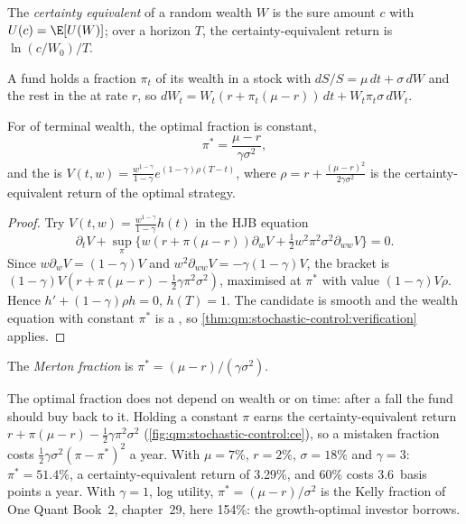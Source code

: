 \begin{definition}\label{def:qm:stochastic-control:ce}
The \emph{certainty equivalent} of a random wealth $W$ is the sure amount $c$
with $U(c) = \E[U(W)]$; over a horizon $T$, the certainty-equivalent return is $\ln(c/W_0)/T$.
\end{definition}

A fund holds a fraction $\pi_t$ of its wealth in a stock with $dS/S = \mu\,dt + \sigma\,dW$ and the rest in the
 at rate $r$, so $dW_t = W_t(r + \pi_t(\mu - r))\,dt + W_t\pi_t\sigma\,dW_t$.

\begin{theorem}[Merton]\label{thm:qm:stochastic-control:merton}
For  of terminal wealth, the optimal fraction is constant,
\[
\pi^* = \frac{\mu - r}{\gamma\sigma^2},
\]
and the  is $V(t, w) = \frac{w^{1-\gamma}}{1-\gamma}e^{(1-\gamma)\rho(T-t)}$, where $\rho = r + \frac{(\mu -
r)^2}{2\gamma\sigma^2}$ is the certainty-equivalent return of the optimal strategy.
\end{theorem}

\begin{proof}
Try $V(t, w) = \frac{w^{1-\gamma}}{1-\gamma}h(t)$ in the HJB equation
\[
\partial_tV + \sup_\pi\bigl\{w(r + \pi(\mu - r))\partial_wV + \tfrac12w^2\pi^2\sigma^2\partial_{ww}V\bigr\} = 0.
\] Since $w\partial_wV = (1 - \gamma)V$ and $w^2\partial_{ww}V = -\gamma(1 - \gamma)V$, the bracket is
$(1 - \gamma)V(r + \pi(\mu - r) - \tfrac12\gamma\pi^2\sigma^2)$, maximised at $\pi^*$ with value $(1 - \gamma)V\rho$. Hence $h' +
(1 - \gamma)\rho h = 0$, $h(T) = 1$. The candidate is smooth and the wealth equation with constant $\pi^*$ is a
, so \cref{thm:qm:stochastic-control:verification} applies.
\end{proof}

\begin{definition}\label{def:qm:stochastic-control:fraction}
The \emph{Merton fraction} is $\pi^* = (\mu - r)/(\gamma\sigma^2)$.
\end{definition}

The optimal fraction does not depend on wealth or on time: after a fall the fund should buy back to it.
Holding a constant $\pi$ earns the certainty-equivalent return $r + \pi(\mu - r) - \tfrac12\gamma\pi^2\sigma^2$
(\cref{fig:qm:stochastic-control:ce}), so a mistaken fraction costs $\tfrac12\gamma\sigma^2(\pi - \pi^*)^2$ a year. With $\mu =
7\%$, $r = 2\%$, $\sigma = 18\%$ and $\gamma = 3$: $\pi^* = 51.4\%$, a certainty-equivalent return of 3.29\%, and 60\%
costs 3.6~basis points a year. With $\gamma = 1$, log utility, $\pi^* = (\mu - r)/\sigma^2$ is the Kelly fraction of One
Quant Book~2, chapter~29, here 154\%: the growth-optimal investor borrows.

